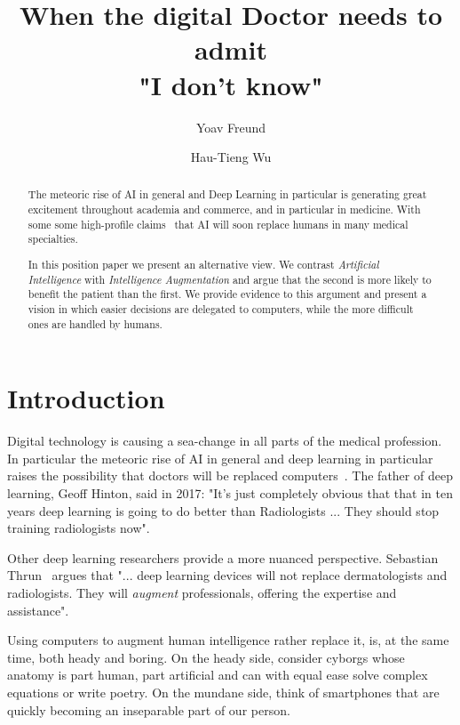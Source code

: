 \documentclass[10pt]{article}
\title{When the digital Doctor needs to admit\\ "I don't know"}
\author{Yoav Freund \and Hau-Tieng Wu}
\begin{document}
\maketitle

\begin{abstract}

  The meteoric rise of AI in general and Deep Learning in particular
  is generating great excitement throughout academia and commerce, and
  in particular in medicine\cite{topol2019deep,
    wachter2015digital}. With some some high-profile claims~\cite{}
  that AI will soon replace humans in many medical specialties.

  In this position paper we present an alternative view. We contrast
  {\em Artificial Intelligence} with {\em Intelligence Augmentation}
  and argue that the second is more likely to benefit the patient than
  the first. We provide evidence to this argument and present a vision
  in which easier decisions are delegated to computers, while the more
  difficult ones are handled by humans.

\end{abstract}


\section*{Introduction}

Digital technology is causing a sea-change in all parts of the medical
profession. In particular the meteoric rise of AI in general and deep
learning in particular raises the possibility that doctors will be
replaced computers~\cite{Mukherjee2017}. The father of deep learning,
Geoff Hinton, said in 2017: "It's just completely obvious that that in
ten years deep learning is going to do better than Radiologists
... They should stop training radiologists now".

Other deep learning researchers provide a more nuanced
perspective. Sebastian
Thrun~\cite{Mukherjee2017,esteva2017dermatologist} argues that
"... deep learning devices will not replace dermatologists and
radiologists. They will {\em augment} professionals, offering the
expertise and assistance".

Using computers to augment human intelligence rather replace it, is,
at the same time, both heady and boring. On the heady side, consider
cyborgs whose anatomy is part human, part artificial and can with
equal ease solve complex equations or write poetry. On the mundane
side, think of smartphones that are quickly becoming an inseparable
part of our person.
 
\end{document}
